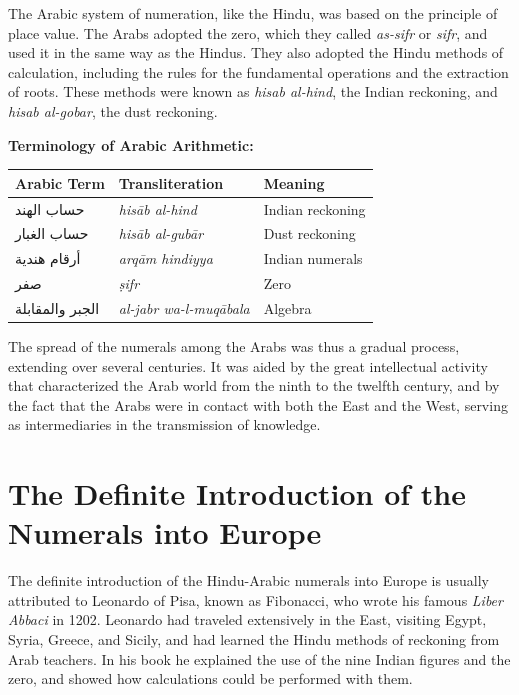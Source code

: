 \documentclass[11pt,a4paper]{article}
\newcommand{\ar}[1]{{\arabicfont #1}}
\newenvironment{arabicpassage}{%
  \begin{tcolorbox}[colback=arabicbg,colframe=rulecolor,boxrule=0.5pt,
    left=8pt,right=8pt,top=6pt,bottom=6pt,fontupper=\arabicfont\large]
}{\end{tcolorbox}}
\begin{document}
The Arabic system of numeration, like the Hindu, was based on the principle of place value. The Arabs adopted the zero, which they called \textit{as-sifr} or \textit{sifr}, and used it in the same way as the Hindus. They also adopted the Hindu methods of calculation, including the rules for the fundamental operations and the extraction of roots. These methods were known as \textit{hisab al-hind}, the Indian reckoning, and \textit{hisab al-gobar}, the dust reckoning.

\begin{arabicpassage}
\textbf{Terminology of Arabic Arithmetic:}

\vspace{0.5em}
\begin{tabular}{|l|l|l|}
\hline
\textbf{Arabic Term} & \textbf{Transliteration} & \textbf{Meaning} \\
\hline
\ar{حساب الهند} & \textit{his\=ab al-hind} & Indian reckoning \\
\ar{حساب الغبار} & \textit{his\=ab al-gub\=ar} & Dust reckoning \\
\ar{أرقام هندية} & \textit{arq\=am hindiyya} & Indian numerals \\
\ar{صفر} & \textit{\d{s}ifr} & Zero \\
\ar{الجبر والمقابلة} & \textit{al-jabr wa-l-muq\=abala} & Algebra \\
\hline
\end{tabular}
\end{arabicpassage}

The spread of the numerals among the Arabs was thus a gradual process, extending over several centuries. It was aided by the great intellectual activity that characterized the Arab world from the ninth to the twelfth century, and by the fact that the Arabs were in contact with both the East and the West, serving as intermediaries in the transmission of knowledge.

\newpage

\section{The Definite Introduction of the Numerals into Europe}

The definite introduction of the Hindu-Arabic numerals into Europe is usually attributed to Leonardo of Pisa, known as Fibonacci, who wrote his famous \textit{Liber Abbaci} in 1202. Leonardo had traveled extensively in the East, visiting Egypt, Syria, Greece, and Sicily, and had learned the Hindu methods of reckoning from Arab teachers. In his book he explained the use of the nine Indian figures and the zero, and showed how calculations could be performed with them.
\end{document}
